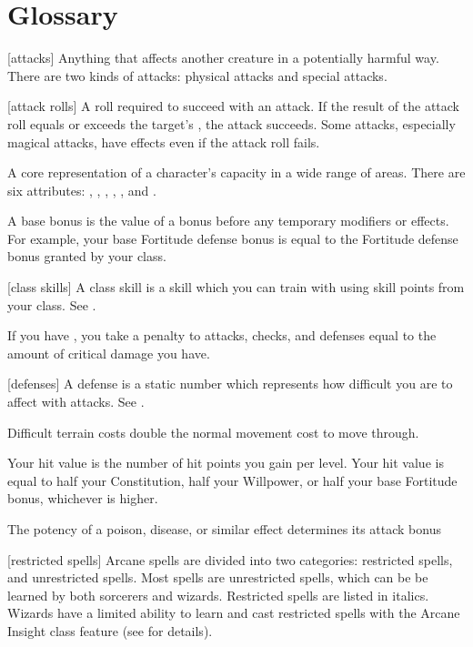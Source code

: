 \chapter{Glossary}\label{Glossary}

[attacks] Anything that affects another creature in a potentially harmful way. There are two kinds of attacks: physical attacks and special attacks.

[attack rolls] A roll required to succeed with an attack. If the result of the attack roll equals or exceeds the target's , the attack succeeds. Some attacks, especially magical attacks, have effects even if the attack roll fails.

 A core representation of a character's capacity in a wide range of areas. There are six attributes: , , , , , and .

 A base bonus is the value of a bonus before any temporary modifiers or effects. For example, your base Fortitude defense bonus is equal to the Fortitude defense bonus granted by your class.

[class skills] A class skill is a skill which you can train with using skill points from your class. See .

 If you have , you take a penalty to attacks, checks, and defenses equal to the amount of critical damage you have.

[defenses] A defense is a static number which represents how difficult you are to affect with attacks. See .

 Difficult terrain costs double the normal movement cost to move through.

 Your hit value is the number of hit points you gain per level. Your hit value is equal to half your Constitution, half your Willpower, or half your base Fortitude bonus, whichever is higher.

 The potency of a poison, disease, or similar effect determines its attack bonus

[restricted spells] Arcane spells are divided into two categories: restricted spells, and unrestricted spells. Most spells are unrestricted spells, which can be be learned by both sorcerers and wizards. Restricted spells are listed in italics. Wizards have a limited ability to learn and cast restricted spells with the Arcane Insight class feature (see  for details).

